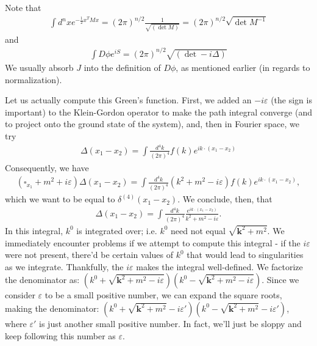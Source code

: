 \documentclass{../mathnotes}
\begin{document}
\begin{rem}
    Note that
    \begin{align*}
        \int d^nx e^{-\frac{1}{2}x^TMx}=(2\pi)^{n/2}\frac{1}{\sqrt{\left( \det M \right)}}=(2\pi)^{n/2}\sqrt{\det M^{-1}}
    \end{align*}
    and
    \begin{align*}
        \int D\phi e^{iS}=(2\pi)^{n/2} \sqrt{\left( \det -i\Delta \right)}
    \end{align*}
    We usually absorb $J$ into the definition of $D\phi$, as mentioned earlier (in regards to normalization).
\end{rem}

Let us actually compute this Green's function. First, we added an $-i\varepsilon$ (the sign is important) to the Klein-Gordon operator to
make the path integral converge (and to project onto the ground state of the system), and, then in Fourier space, we try
\begin{align*}
    \Delta(x_1-x_2)=\int \frac{d^4k}{(2\pi)^4}f(k)e^{ik\cdot (x_1-x_2)}
\end{align*}
Consequently, we have
\begin{align*}
    \left( \square_{x_1}+m^2+i\varepsilon \right)\Delta(x_1-x_2)=\int \frac{d^4k}{(2\pi)^4}(k^2+m^2-i\varepsilon)f(k)e^{ik\cdot (x_1-x_2)},
\end{align*}
which we want to be equal to $\delta^{(4)}(x_1-x_2)$. We conclude, then, that
\begin{align*}
    \Delta(x_1-x_2)=\int\frac{d^4k}{(2\pi)^4}\frac{e^{ik\cdot(x_1-x_2)}}{k^2+m^2-i\varepsilon}.
\end{align*}
In this integral, $k^0$ is integrated over; i.e. $k^0$ need not equal $\sqrt{\mathbf{k}^2+m^2}$. We immediately encounter problems if
we attempt to compute this integral - if the $i\varepsilon$ were not present, there'd be certain values of $k^0$ that would lead
to singularities as we integrate. Thankfully, the $i\varepsilon$ makes the integral well-defined. We factorize the denominator as:
$\left( k^0+\sqrt{\mathbf{k}^2+m^2-i\varepsilon} \right)\left( k^0-\sqrt{\mathbf{k}^2+m^2-i\varepsilon} \right)$. Since we consider $\varepsilon$
to be a small positive number, we can expand the square roots, making the denominator:
$\left( k^0+\sqrt{\mathbf{k}^2+m^2}-i\varepsilon' \right)\left( k^0-\sqrt{\mathbf{k}^2+m^2}-i\varepsilon' \right)$,
where $\varepsilon'$ is just another small positive number. In fact, we'll just be sloppy and keep following this number as $\varepsilon$.
\end{document}
